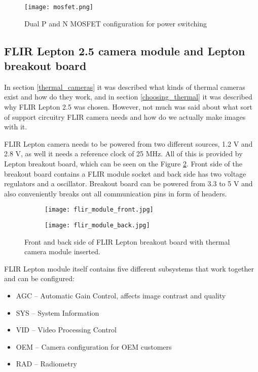 \begin{figure}[ht]
        \centering
        \texttt{[image: mosfet.png]} 
        \caption{ Dual P and N MOSFET configuration for power switching}
        \label{mosfet}
\end{figure}

\subsection{ FLIR Lepton 2.5 camera module and Lepton breakout board}

In section \ref{thermal_cameras} it was described what kinds of thermal cameras exist and how do they work, and in section \ref{choosing_thermal} it was described why FLIR Lepton 2.5 was chosen.
However, not much was said about what sort of support circuitry FLIR camera needs and how do we actually make images with it.

FLIR Lepton camera needs to be powered from two different sources, 1.2 \si{\volt} and 2.8 \si{\volt}, as well it needs a reference clock of 25 \si{\mega\hertz}.
All of this is provided by Lepton breakout board, which can be seen on the Figure \ref{lepton_breakout}.
Front side of the breakout board contains a FLIR module socket and back side has two voltage regulators and a oscillator.
Breakout board can be powered from 3.3 to 5 \si{\volt} and also conveniently breaks out all communication pins in form of headers.

\begin{figure}[ht] 
    \begin{subfigure}[b]{0.5\textwidth}
        \centering
        \texttt{[image: flir\_module\_front.jpg]} 
    \end{subfigure}
    \begin{subfigure}[b]{0.5\textwidth}
        \centering
        \texttt{[image: flir\_module\_back.jpg]} 
    \end{subfigure}
    \caption{ Front and back side of FLIR Lepton breakout board with thermal camera module inserted.}
    \label{lepton_breakout}
\end{figure}

FLIR Lepton module itself contains five different subsystems that work together and can be configured:

\begin{itemize}
    \item AGC – Automatic Gain Control, affects image contrast and quality
    \item SYS – System Information
    \item VID – Video Processing Control
    \item OEM – Camera configuration for OEM customers
    \item RAD – Radiometry
\end{itemize}

